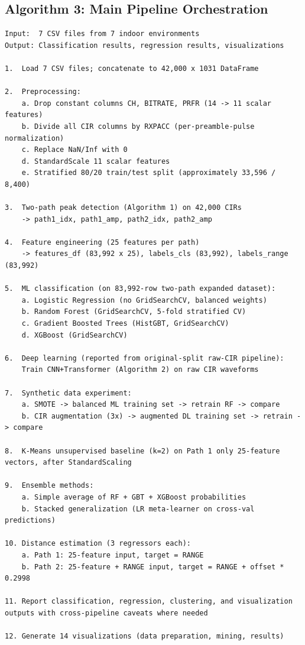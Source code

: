 \documentclass[12pt,a4paper]{article}
\begin{document}
\subsection{Algorithm 3: Main Pipeline
Orchestration}\label{algorithm-3-main-pipeline-orchestration}

\begin{lstlisting}
Input:  7 CSV files from 7 indoor environments
Output: Classification results, regression results, visualizations

1.  Load 7 CSV files; concatenate to 42,000 x 1031 DataFrame

2.  Preprocessing:
    a. Drop constant columns CH, BITRATE, PRFR (14 -> 11 scalar features)
    b. Divide all CIR columns by RXPACC (per-preamble-pulse normalization)
    c. Replace NaN/Inf with 0
    d. StandardScale 11 scalar features
    e. Stratified 80/20 train/test split (approximately 33,596 / 8,400)

3.  Two-path peak detection (Algorithm 1) on 42,000 CIRs
    -> path1_idx, path1_amp, path2_idx, path2_amp

4.  Feature engineering (25 features per path)
    -> features_df (83,992 x 25), labels_cls (83,992), labels_range (83,992)

5.  ML classification (on 83,992-row two-path expanded dataset):
    a. Logistic Regression (no GridSearchCV, balanced weights)
    b. Random Forest (GridSearchCV, 5-fold stratified CV)
    c. Gradient Boosted Trees (HistGBT, GridSearchCV)
    d. XGBoost (GridSearchCV)

6.  Deep learning (reported from original-split raw-CIR pipeline):
    Train CNN+Transformer (Algorithm 2) on raw CIR waveforms

7.  Synthetic data experiment:
    a. SMOTE -> balanced ML training set -> retrain RF -> compare
    b. CIR augmentation (3x) -> augmented DL training set -> retrain -> compare

8.  K-Means unsupervised baseline (k=2) on Path 1 only 25-feature vectors, after StandardScaling

9.  Ensemble methods:
    a. Simple average of RF + GBT + XGBoost probabilities
    b. Stacked generalization (LR meta-learner on cross-val predictions)

10. Distance estimation (3 regressors each):
    a. Path 1: 25-feature input, target = RANGE
    b. Path 2: 25-feature + RANGE input, target = RANGE + offset * 0.2998

11. Report classification, regression, clustering, and visualization outputs with cross-pipeline caveats where needed

12. Generate 14 visualizations (data preparation, mining, results)
\end{lstlisting}
\end{document}
